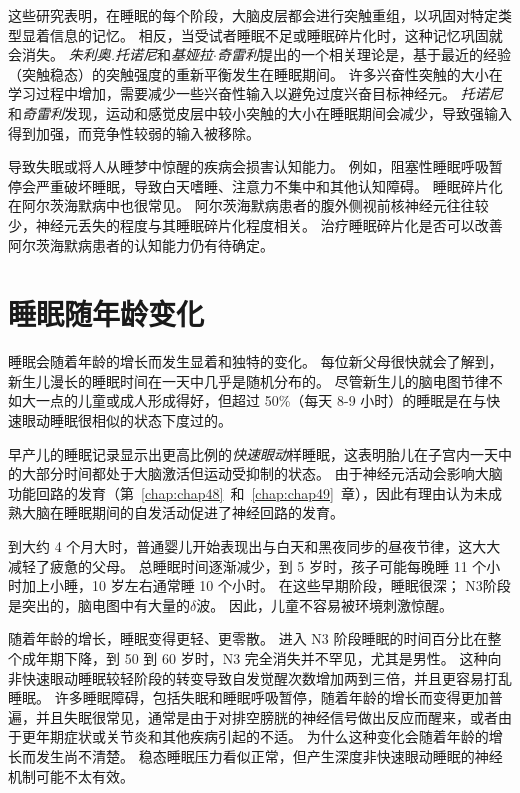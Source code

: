 这些研究表明，在睡眠的每个阶段，大脑皮层都会进行突触重组，以巩固对特定类型显着信息的记忆。
相反，当受试者睡眠不足或睡眠碎片化时，这种记忆巩固就会消失。
\textit{朱利奥.托诺尼}和\textit{基娅拉$\cdot$奇雷利}提出的一个相关理论是，基于最近的经验（突触稳态）的突触强度的重新平衡发生在睡眠期间。
许多兴奋性突触的大小在学习过程中增加，需要减少一些兴奋性输入以避免过度兴奋目标神经元。
\textit{托诺尼}和\textit{奇雷利}发现，运动和感觉皮层中较小突触的大小在睡眠期间会减少，导致强输入得到加强，而竞争性较弱的输入被移除。


导致失眠或将人从睡梦中惊醒的疾病会损害认知能力。
例如，阻塞性睡眠呼吸暂停会严重破坏睡眠，导致白天嗜睡、注意力不集中和其他认知障碍。
睡眠碎片化在阿尔茨海默病中也很常见。
阿尔茨海默病患者的腹外侧视前核神经元往往较少，神经元丢失的程度与其睡眠碎片化程度相关。
治疗睡眠碎片化是否可以改善阿尔茨海默病患者的认知能力仍有待确定。



\section{睡眠随年龄变化}

睡眠会随着年龄的增长而发生显着和独特的变化。
每位新父母很快就会了解到，新生儿漫长的睡眠时间在一天中几乎是随机分布的。
尽管新生儿的脑电图节律不如大一点的儿童或成人形成得好，但超过 50\%（每天 8-9 小时）的睡眠是在与快速眼动睡眠很相似的状态下度过的。


早产儿的睡眠记录显示出更高比例的\textit{快速眼动}样睡眠，这表明胎儿在子宫内一天中的大部分时间都处于大脑激活但运动受抑制的状态。
由于神经元活动会影响大脑功能回路的发育（第~\ref{chap:chap48}~和~\ref{chap:chap49}~章），因此有理由认为未成熟大脑在睡眠期间的自发活动促进了神经回路的发育。


到大约 4 个月大时，普通婴儿开始表现出与白天和黑夜同步的昼夜节律，这大大减轻了疲惫的父母。
总睡眠时间逐渐减少，到 5 岁时，孩子可能每晚睡 11 个小时加上小睡，10 岁左右通常睡 10 个小时。
在这些早期阶段，睡眠很深；
N3阶段是突出的，脑电图中有大量的$ \delta $波。
因此，儿童不容易被环境刺激惊醒。


随着年龄的增长，睡眠变得更轻、更零散。
进入 N3 阶段睡眠的时间百分比在整个成年期下降，到 50 到 60 岁时，N3 完全消失并不罕见，尤其是男性。
这种向非快速眼动睡眠较轻阶段的转变导致自发觉醒次数增加两到三倍，并且更容易打乱睡眠。
许多睡眠障碍，包括失眠和睡眠呼吸暂停，随着年龄的增长而变得更加普遍，并且失眠很常见，通常是由于对排空膀胱的神经信号做出反应而醒来，或者由于更年期症状或关节炎和其他疾病引起的不适。
为什么这种变化会随着年龄的增长而发生尚不清楚。
稳态睡眠压力看似正常，但产生深度非快速眼动睡眠的神经机制可能不太有效。



